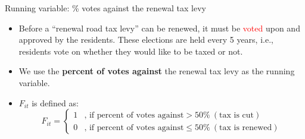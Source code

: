 \documentclass{beamer}
\begin{document}
\begin{frame}{Running variable: \% votes against the renewal tax levy}
    \begin{itemize}
        \item Before a ``renewal road tax levy'' can be renewed, it must be \textcolor{red}{voted} upon and approved by the residents. These elections are held every 5 years, i.e., residents vote on whether they would like to be taxed or not.
        \item We use the \textbf{percent of votes against} the renewal tax levy as the running variable.
        \item $F_{it}$ is defined as:
            \begin{equation*}
                F_{it} = 
                \begin{cases}
                    1 & \text{, if percent of votes against} > 50\% \ (\text{tax is cut}) \\
                    0 & \text{, if percent of votes against} \leq 50\% \ (\text{tax is renewed})
                \end{cases}
            \end{equation*}
    \end{itemize}
    \begin{flushright}
        \href{https://www.beavercreektwpohio.gov/319/Renewal-Road-Levy}{}
        \href{https://www.cleveland.com/community/2020/11/south-euclid-voters-approve-road-levy-renewal-mayfield-village-residents-pass-four-cleanup-issues.html}{}
    \end{flushright}
\end{frame}
\end{document}

